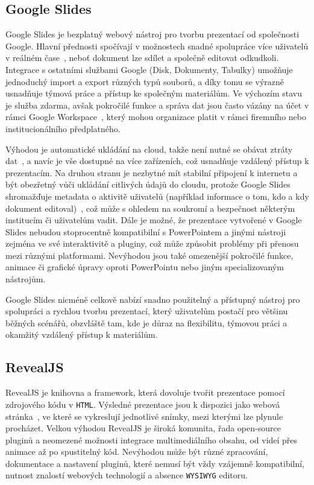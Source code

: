 \subsection{Google Slides}\label{text:google_slides}

Google Slides je bezplatný webový nástroj pro tvorbu prezentací od společnosti Google. 
Hlavní přednosti spočívají v možnostech snadné spolupráce více uživatelů v reálném čase~\cite{slides}, neboť dokument lze sdílet a společně editovat odkudkoli.
Integrace s ostatními službami Google (Disk, Dokumenty, Tabulky) umožňuje jednoduchý import a export různých typů souborů, a díky tomu se výrazně usnadňuje týmová práce a přístup ke společným materiálům. 
Ve výchozím stavu je služba zdarma, avšak pokročilé funkce a správa dat jsou často vázány na účet v rámci Google Workspace~\cite{slides}, který mohou organizace platit v rámci firemního nebo institucionálního předplatného. 

Výhodou je automatické ukládání na cloud, takže není nutné se obávat ztráty dat~\cite{slides}, a navíc je vše dostupné na více zařízeních, což usnadňuje vzdálený přístup k prezentacím. 
Na druhou stranu je nezbytné mít stabilní připojení k internetu a být obezřetný vůči ukládání citlivých údajů do cloudu, protože Google Slides shromažďuje metadata o aktivitě uživatelů (například informace o tom, kdo a kdy dokument editoval)~\cite{google_terms}, což může s ohledem na soukromí a bezpečnost některým institucím či uživatelům vadit. 
Dále je možné, že prezentace vytvořené v Google Slides nebudou stoprocentně kompatibilní s PowerPointem a jinými nástroji zejména ve své interaktivitě a pluginy, což může způsobit problémy při přenosu mezi různými platformami. 
Nevýhodou jsou také omezenější pokročilé funkce, animace či grafické úpravy oproti PowerPointu nebo jiným specializovaným nástrojům. 

Google Slides nicméně celkově nabízí snadno použitelný a přístupný nástroj pro spolupráci a rychlou tvorbu prezentací, který uživatelům postačí pro většinu běžných scénářů, obzvláště tam, kde je důraz na flexibilitu, týmovou práci a okamžitý vzdálený přístup k materiálům.


\subsection{RevealJS}\label{text:revealjs}

RevealJS je knihovna a framework, která dovoluje tvořit prezentace pomocí zdrojového kódu v \texttt{HTML}. 
Výsledné prezentace jsou k dispozici jako webová stránka~\cite{revealjs}, ve které se vykreslují jednotlivé snímky, mezi kterými lze plynule procházet. 
Velkou výhodou RevealJS je široká komunita, řada open-source pluginů a neomezené možnosti integrace multimediálního obsahu, od videí přes animace až po spustitelný kód. 
Nevýhodou může být různé zpracování, dokumentace a nastavení pluginů, které nemusí být vždy vzájemně kompatibilní, nutnost znalostí webových technologií a absence \texttt{WYSIWYG} editoru. 

